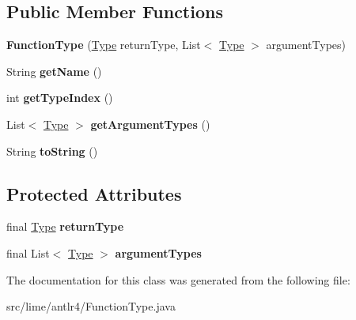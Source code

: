 \subsection*{Public Member Functions}
\begin{DoxyCompactItemize}
\item 
\mbox{\label{classlime_1_1antlr4_1_1FunctionType_a1f9cf618ef349d75a9eb58d8a6c4d74d}} 
{\bfseries Function\+Type} (\hyperlink{interfacelime_1_1antlr4_1_1Type}{Type} return\+Type, List$<$ \hyperlink{interfacelime_1_1antlr4_1_1Type}{Type} $>$ argument\+Types)
\item 
\mbox{\label{classlime_1_1antlr4_1_1FunctionType_a4dffd0e94cb9e3f59d29752052e9852a}} 
String {\bfseries get\+Name} ()
\item 
\mbox{\label{classlime_1_1antlr4_1_1FunctionType_a92f86a4aa69b7940a87702d9d610bc32}} 
int {\bfseries get\+Type\+Index} ()
\item 
\mbox{\label{classlime_1_1antlr4_1_1FunctionType_a82881cf0408cd2a28a30429933da2ac8}} 
List$<$ \hyperlink{interfacelime_1_1antlr4_1_1Type}{Type} $>$ {\bfseries get\+Argument\+Types} ()
\item 
\mbox{\label{classlime_1_1antlr4_1_1FunctionType_a57a702a2873d1c973c846a2188482eec}} 
String {\bfseries to\+String} ()
\end{DoxyCompactItemize}
\subsection*{Protected Attributes}
\begin{DoxyCompactItemize}
\item 
\mbox{\label{classlime_1_1antlr4_1_1FunctionType_a6b7392827b70ddb03b1ebc056dd97442}} 
final \hyperlink{interfacelime_1_1antlr4_1_1Type}{Type} {\bfseries return\+Type}
\item 
\mbox{\label{classlime_1_1antlr4_1_1FunctionType_ac595a5b819321345ae3f3e74acd8e57e}} 
final List$<$ \hyperlink{interfacelime_1_1antlr4_1_1Type}{Type} $>$ {\bfseries argument\+Types}
\end{DoxyCompactItemize}


The documentation for this class was generated from the following file\+:\begin{DoxyCompactItemize}
\item 
src/lime/antlr4/Function\+Type.\+java\end{DoxyCompactItemize}

